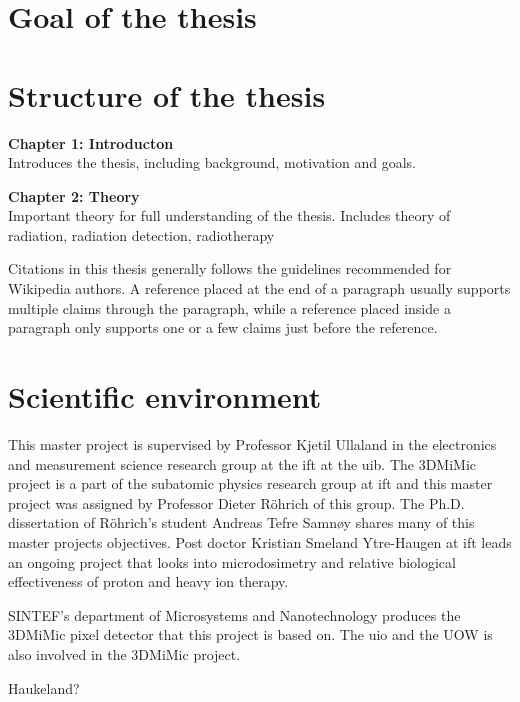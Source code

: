\documentclass[../main/thesis.tex]{subfiles}
\begin{document}
\section{Goal of the thesis}
\label{i-goal}




\section{Structure of the thesis}
\label{i-structure}
\textbf{Chapter 1: Introducton}\\
Introduces the thesis, including background, motivation and goals.

\textbf{Chapter 2: Theory}\\
Important theory for full understanding of the thesis. Includes theory of radiation, radiation detection, radiotherapy

Citations in this thesis generally follows the guidelines recommended for Wikipedia authors. A reference placed at the end of a paragraph usually supports multiple claims through the paragraph, while a reference placed inside a paragraph only supports one or a few claims just before the reference.

\section{Scientific environment}
\label{i-environment}
This master project is supervised by Professor Kjetil Ullaland in the electronics and measurement science research group at the \gls{ift} at the \gls{uib}. The 3DMiMic project is a part of the subatomic physics research group at \gls{ift} and this master project was assigned by Professor Dieter Röhrich of this group. The Ph.D. dissertation of Röhrich's student Andreas Tefre Samnøy shares many of this master projects objectives. Post doctor Kristian Smeland Ytre-Haugen at \gls{ift} leads an ongoing project that looks into microdosimetry and relative biological effectiveness of proton and heavy ion therapy. 

SINTEF's department of Microsystems and Nanotechnology produces the 3DMiMic pixel detector that this project is based on. The \gls{uio} and the \gls{UOW} is also involved in the 3DMiMic project. 

Haukeland?
\end{document}
